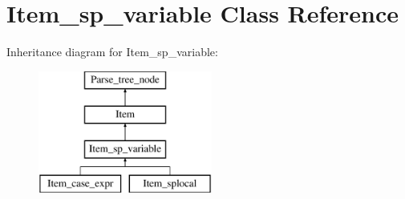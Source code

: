 \hypertarget{classItem__sp__variable}{}\section{Item\+\_\+sp\+\_\+variable Class Reference}
\label{classItem__sp__variable}
Inheritance diagram for Item\+\_\+sp\+\_\+variable\+:\begin{figure}[H]
\begin{center}
\leavevmode
\includegraphics[height=4.000000cm]{classItem__sp__variable}
\end{center}
\end{figure}
